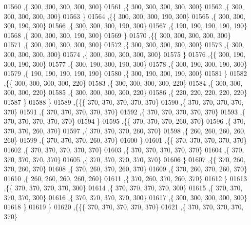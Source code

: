 \begin{DoxyCode}
01560    ,\{   300,   300,   300,   300,   300\}
01561    ,\{   300,   300,   300,   300,   300\}
01562    ,\{   300,   300,   300,   300,   300\}
01563    \}
01564   ,\{\{   300,   300,   300,   190,   300\}
01565    ,\{   300,   300,   300,   190,   300\}
01566    ,\{   300,   300,   300,   190,   300\}
01567    ,\{   190,   190,   190,   190,   190\}
01568    ,\{   300,   300,   300,   190,   300\}
01569    \}
01570   ,\{\{   300,   300,   300,   300,   300\}
01571    ,\{   300,   300,   300,   300,   300\}
01572    ,\{   300,   300,   300,   300,   300\}
01573    ,\{   300,   300,   300,   300,   300\}
01574    ,\{   300,   300,   300,   300,   300\}
01575    \}
01576   ,\{\{   300,   190,   300,   190,   300\}
01577    ,\{   300,   190,   300,   190,   300\}
01578    ,\{   300,   190,   300,   190,   300\}
01579    ,\{   190,   190,   190,   190,   190\}
01580    ,\{   300,   190,   300,   190,   300\}
01581    \}
01582   ,\{\{   300,   300,   300,   300,   220\}
01583    ,\{   300,   300,   300,   300,   220\}
01584    ,\{   300,   300,   300,   300,   220\}
01585    ,\{   300,   300,   300,   300,   220\}
01586    ,\{   220,   220,   220,   220,   220\}
01587    \}
01588   \}
01589  ,\{\{\{   370,   370,   370,   370,   370\}
01590    ,\{   370,   370,   370,   370,   370\}
01591    ,\{   370,   370,   370,   370,   370\}
01592    ,\{   370,   370,   370,   370,   370\}
01593    ,\{   370,   370,   370,   370,   370\}
01594    \}
01595   ,\{\{   370,   370,   370,   260,   370\}
01596    ,\{   370,   370,   370,   260,   370\}
01597    ,\{   370,   370,   370,   260,   370\}
01598    ,\{   260,   260,   260,   260,   260\}
01599    ,\{   370,   370,   370,   260,   370\}
01600    \}
01601   ,\{\{   370,   370,   370,   370,   370\}
01602    ,\{   370,   370,   370,   370,   370\}
01603    ,\{   370,   370,   370,   370,   370\}
01604    ,\{   370,   370,   370,   370,   370\}
01605    ,\{   370,   370,   370,   370,   370\}
01606    \}
01607   ,\{\{   370,   260,   370,   260,   370\}
01608    ,\{   370,   260,   370,   260,   370\}
01609    ,\{   370,   260,   370,   260,   370\}
01610    ,\{   260,   260,   260,   260,   260\}
01611    ,\{   370,   260,   370,   260,   370\}
01612    \}
01613   ,\{\{   370,   370,   370,   370,   300\}
01614    ,\{   370,   370,   370,   370,   300\}
01615    ,\{   370,   370,   370,   370,   300\}
01616    ,\{   370,   370,   370,   370,   300\}
01617    ,\{   300,   300,   300,   300,   300\}
01618    \}
01619   \}
01620  ,\{\{\{   370,   370,   370,   370,   370\}
01621    ,\{   370,   370,   370,   370,   370\}

\end{DoxyCode}
